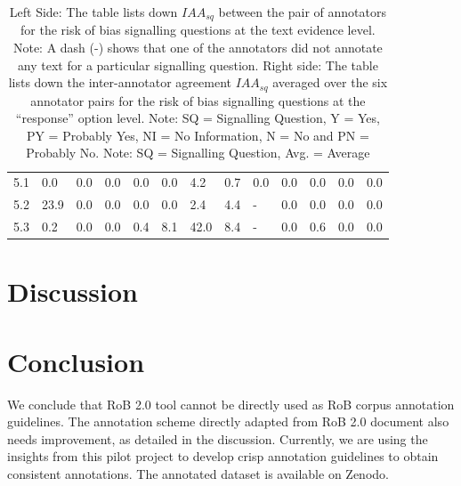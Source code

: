 \documentclass{IOS-Book-Article}
\begin{document}
\begin{table}[!ht]
\begin{tabular}{|l||l|l|l|l|l|l|l||l|l|l|l|l|}
        5.1 & 0.0 & 0.0 & 0.0 & 0.0 & 0.0 & 4.2 & 0.7 & 0.0 & 0.0 & 0.0 & 0.0 & 0.0 \\ 
        5.2 & 23.9 & 0.0 & 0.0 & 0.0 & 0.0 & 2.4 & 4.4 & - & 0.0 & 0.0 & 0.0 & 0.0 \\ 
        5.3 & 0.2 & 0.0 & 0.0 & 0.4 & 8.1 & 42.0 & 8.4 & - & 0.0 & 0.6 & 0.0 & 0.0 \\ \hline
    \end{tabular}
    \caption{\label{tab:iaa_sq_res} Left Side: The table lists down $IAA_{sq}$ between the pair of annotators for the risk of bias signalling questions at the text evidence level. Note: A dash (-) shows that one of the annotators did not annotate any text for a particular signalling question. Right side: The table lists down the inter-annotator agreement $IAA_{sq}$ averaged over the six annotator pairs for the risk of bias signalling questions at the ``response'' option level. Note: SQ = Signalling Question, Y = Yes, PY = Probably Yes, NI = No Information, N = No and PN = Probably No. Note: SQ = Signalling Question, Avg. = Average}
\end{table}

%
%
%
\section{Discussion}

\section{Conclusion}
\label{sec:conclusion}
%
We conclude that RoB 2.0 tool cannot be directly used as RoB corpus annotation guidelines.
The annotation scheme directly adapted from RoB 2.0 document also needs improvement, as detailed in the discussion.
Currently, we are using the insights from this pilot project to develop crisp annotation guidelines to obtain consistent annotations.
The annotated dataset is available on Zenodo.
%
%
%
 
%
%

%
\end{document}
